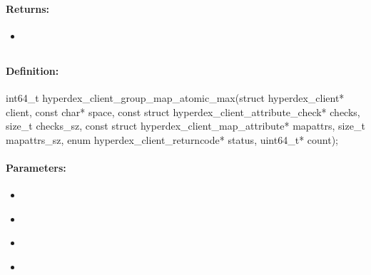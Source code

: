 \paragraph{Returns:}
\begin{itemize}[noitemsep]
\item {}\\

\end{itemize}

\pagebreak
\subsection{}
\label{api:c:group_map_atomic_max}


\paragraph{Definition:}
\begin{ccode}
int64_t hyperdex_client_group_map_atomic_max(struct hyperdex_client* client,
        const char* space,
        const struct hyperdex_client_attribute_check* checks, size_t checks_sz,
        const struct hyperdex_client_map_attribute* mapattrs, size_t mapattrs_sz,
        enum hyperdex_client_returncode* status,
        uint64_t* count);
\end{ccode}

\paragraph{Parameters:}
\begin{itemize}[noitemsep]
\item {}\\

\item {}\\

\item {}\\

\item {}\\

\end{itemize}

